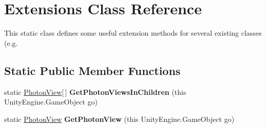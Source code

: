 \hypertarget{class_extensions}{}\section{Extensions Class Reference}
\label{class_extensions}


This static class defines some useful extension methods for several existing classes (e.\+g.  


\subsection*{Static Public Member Functions}
\begin{DoxyCompactItemize}
\item 
static \hyperlink{class_photon_view}{Photon\+View}\mbox{[}$\,$\mbox{]} {\bfseries Get\+Photon\+Views\+In\+Children} (this Unity\+Engine.\+Game\+Object go)\hypertarget{class_extensions_abd9afd41c4e0ce06bc3b49c04bed4523}{}\label{class_extensions_abd9afd41c4e0ce06bc3b49c04bed4523}

\item 
static \hyperlink{class_photon_view}{Photon\+View} {\bfseries Get\+Photon\+View} (this Unity\+Engine.\+Game\+Object go)\hypertarget{class_extensions_a32cd3eb67b60887a800ecbc88ed7f121}{}\label{class_extensions_a32cd3eb67b60887a800ecbc88ed7f121}


\end{DoxyCompactItemize}
